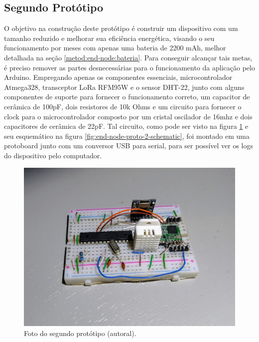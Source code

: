 \subsection{Segundo Protótipo}
\label{metod:end-node:2-proto}
O objetivo na construção deste protótipo é construir um dispositivo com um tamanho reduzido e melhorar sua eficiência energética, visando o seu funcionamento por meses com apenas uma bateria de 2200 mAh, melhor detalhada na seção \ref{metod:end-node:bateria}. Para conseguir alcançar tais metas, é preciso remover as partes desnecessárias para o funcionamento da aplicação pelo Arduino. Empregando apenas os componentes essenciais, microcontrolador Atmega328, transceptor LoRa RFM95W e o sensor DHT-22, junto com alguns componentes de suporte para fornecer o funcionamento correto, um capacitor de cerâmica de 100pF, dois resistores de 10k Ohms  e um circuito para fornecer o clock para o microcontrolador composto por um cristal oscilador de 16mhz e dois capacitores de cerâmica de 22pF. Tal circuito, como pode ser visto na figura \ref{fig:end-node-proto-2} e seu esquemático na figura \ref{fig:end-node-proto-2-schematic}, foi montado em uma protoboard junto com um conversor USB para serial, para ser possível ver os logs do dispositivo pelo computador.

\begin{figure}[H]
  \centering
  \includegraphics[width=.80\textwidth]{assets/end-node-proto-2.png} 
  \caption{Foto do segundo protótipo (autoral).}
  \label{fig:end-node-proto-2} 
\end{figure}

